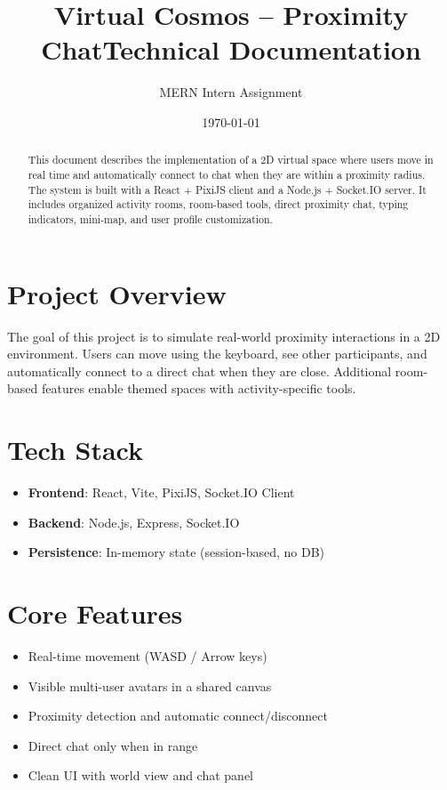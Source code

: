 \documentclass[11pt]{article}
\title{Virtual Cosmos -- Proximity Chat\newline\large Technical Documentation}
\author{MERN Intern Assignment}
\date{\today}
\begin{document}
\maketitle

\begin{abstract}
This document describes the implementation of a 2D virtual space where users move in real time and automatically connect to chat when they are within a proximity radius. The system is built with a React + PixiJS client and a Node.js + Socket.IO server. It includes organized activity rooms, room-based tools, direct proximity chat, typing indicators, mini-map, and user profile customization.
\end{abstract}

\tableofcontents
\newpage

\section{Project Overview}
The goal of this project is to simulate real-world proximity interactions in a 2D environment. Users can move using the keyboard, see other participants, and automatically connect to a direct chat when they are close. Additional room-based features enable themed spaces with activity-specific tools.

\section{Tech Stack}
\begin{itemize}[leftmargin=*]
  \item \textbf{Frontend}: React, Vite, PixiJS, Socket.IO Client
  \item \textbf{Backend}: Node.js, Express, Socket.IO
  \item \textbf{Persistence}: In-memory state (session-based, no DB)
\end{itemize}

\section{Core Features}
\begin{itemize}[leftmargin=*]
  \item Real-time movement (WASD / Arrow keys)
  \item Visible multi-user avatars in a shared canvas
  \item Proximity detection and automatic connect/disconnect
  \item Direct chat only when in range
  \item Clean UI with world view and chat panel
\end{itemize}
\end{document}
